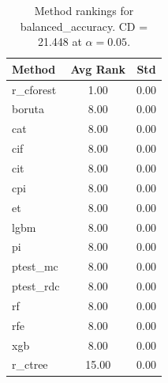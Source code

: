 \begin{table}[h]
\centering
\caption{Method rankings for balanced_accuracy. CD = 21.448 at $\alpha=0.05$.}
\label{tab:ranks_balanced_accuracy}
\begin{tabular}{lcc}
\toprule
Method & Avg Rank & Std \\
\midrule
r_cforest & 1.00 & 0.00 \\
boruta & 8.00 & 0.00 \\
cat & 8.00 & 0.00 \\
cif & 8.00 & 0.00 \\
cit & 8.00 & 0.00 \\
cpi & 8.00 & 0.00 \\
et & 8.00 & 0.00 \\
lgbm & 8.00 & 0.00 \\
pi & 8.00 & 0.00 \\
ptest_mc & 8.00 & 0.00 \\
ptest_rdc & 8.00 & 0.00 \\
rf & 8.00 & 0.00 \\
rfe & 8.00 & 0.00 \\
xgb & 8.00 & 0.00 \\
r_ctree & 15.00 & 0.00 \\
\bottomrule
\end{tabular}
\end{table}